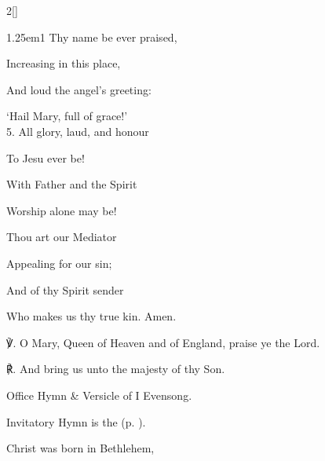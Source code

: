 \begin{paracol}{2}[]
\begin{hangparas}{1.25em}{1}
Thy name be ever praised,

Increasing in this place,

And loud the angel's greeting:

`Hail Mary, full of grace!'\\

5. All glory, laud, and honour

To Jesu ever be!

With Father and the Spirit

Worship alone may be!

Thou art our Mediator

Appealing for our sin;

And of thy Spirit sender

Who makes us thy true kin. Amen.\\
\end{hangparas}

    ℣. O Mary, Queen of Heaven and of England, praise ye the Lord.

	℟. And bring us unto the majesty of thy Son.
	


\secondEvensong

\begin{rubric}
	Office Hymn \& Versicle of I Evensong.
\end{rubric}



\switchcolumn

\vspace{-1\baselineskip}

\mattins

\begin{rubric}
		Invitatory Hymn is the  (p. \pageref{SalveRegina}).
\end{rubric}


\mattinsOfficeHymn

 Christ was born in Bethlehem,\par
{}


\end{paracol}
